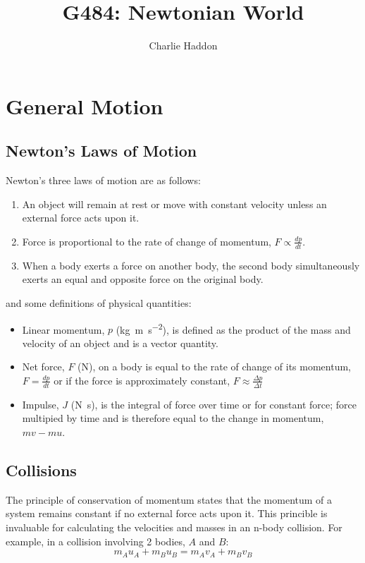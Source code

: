 \documentclass[a4,8pt]{article}
\title{G484: Newtonian World}
\author{Charlie Haddon}
\begin{document}
\begin{titlepage}
	\pagenumbering{}
	\maketitle
	\vspace{15cm}
\end{titlepage}
\clearpage


\section{General Motion}

\subsection{Newton's Laws of Motion}

Newton's three laws of motion are as follows:
\begin{enumerate}
	\item An object will remain at rest or move with constant velocity
          unless an external force acts upon it.
	\item Force is proportional to the rate of change of momentum, $F
          \propto \frac{dp}{dt}$.
	\item When a body exerts a force on another body, the second body
          simultaneously exerts an equal and opposite force on the original
          body.
\end{enumerate}


and some definitions of physical quantities:
\begin{itemize}
	\item Linear momentum, $p$ (\si{\kilo\gram\metre\per\square\second}), is
          defined as the product of the mass and velocity of an object and is a
          vector quantity.
	\item Net force, $F$ (\si{\newton}), on a body is equal to the rate of
          change of its momentum, $F=\frac{dp}{dt}$ or if the force is
          approximately constant, $F \approx \frac{\Delta p}{\Delta t}$
	\item Impulse, $J$ (\si{\newton\second}), is the integral of force over
          time or for constant force; force multipied by time and is therefore
          equal to the change in momentum, $mv-mu$.
\end{itemize}


\subsection{Collisions}
The principle of conservation of momentum states that the momentum of a system
remains constant if no external force acts upon it. This princible is invaluable
for calculating the velocities and masses in an n-body collision. For example,
in a collision involving 2 bodies, $A$ and $B$:
$$m_A u_A + m_B u_B = m_A v_A + m_B v_B$$
\end{document}
